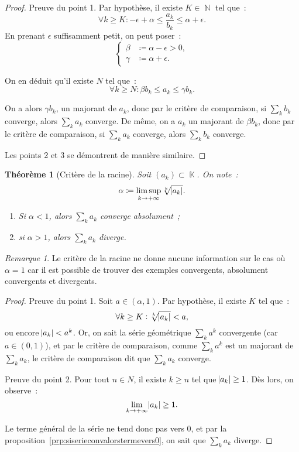 \documentclass{article}
\DeclareMathOperator{\K}{\mathbb K}
\DeclareMathOperator{\N}{\mathbb N}
\newtheorem{thm}{Théorème}[section]
\theoremstyle{definition}
\theoremstyle{remark}
\newtheorem*{rmq}{Remarque}
\begin{document}
		\begin{proof} Preuve du point 1. Par hypothèse, il existe $K \in \N$ tel que~:
		\[\forall k \geq K : -\epsilon + \alpha \leq \frac {a_k}{b_k} \leq \alpha + \epsilon.\]
		En prenant $\epsilon$ suffisamment petit, on peut poser~:
		\[\begin{cases}\beta &\coloneqq \alpha - \epsilon > 0, \\\gamma &\coloneqq \alpha + \epsilon.\end{cases}\]

		On en déduit qu'il existe $N$ tel que~:
		\[\forall k \geq N : \beta b_k \leq a_k \leq \gamma b_k.\]

		On a alors $\gamma b_k$, un majorant de $a_k$,  donc par le critère de comparaison, si $\sum_k b_k$ converge, alors $\sum_k a_k$ converge.
		De même, on a $a_k$ un majorant de $\beta b_k$, donc par le critère de comparaison, si $\sum_k a_k$ converge, alors $\sum_k b_k$ converge.

		Les points 2 et 3 se démontrent de manière similaire.
		\end{proof}

		\begin{thm}[Critère de la racine] Soit $(a_k) \subset \K$. On note~:
		\[\alpha \coloneqq \limsup_{k \to +\infty}\sqrt[k]{\abs {a_k}}.\]

		\begin{enumerate}
			\item Si $\alpha < 1$, alors $\sum_k a_k$ converge absolument~;
			\item si $\alpha > 1$, alors $\sum_k a_k$ diverge.
		\end{enumerate}
		\end{thm}

		\begin{rmq} Le critère de la racine ne donne aucune information sur le cas où $\alpha = 1$ car il est possible de trouver des exemples convergents,
		absolument convergents et divergents.
		\end{rmq}

		\begin{proof} Preuve du point 1. Soit $a \in (\alpha, 1)$. Par hypothèse, il existe $K$ tel que~:
		\[\forall k \geq K : \sqrt[k]{\abs {a_k}} < a,\]
		ou encore $\abs {a_k} < a^k$. Or, on sait la série géométrique $\sum_k a^k$ convergente (car $a \in (0, 1)$), et par le critère de comparaison, comme
		$\sum_k a^k$ est un majorant de $\sum_k a_k$, le critère de comparaison dit que $\sum_k a_k$ converge.

		Preuve du point 2. Pour tout $n \in N$, il existe $k \geq n$ tel que $\abs {a_k} \geq 1$. Dès lors, on observe~:
		\[\lim_{k \to +\infty}\abs {a_k} \geq 1.\]

		Le terme général de la série ne tend donc pas vers 0, et par la proposition~\ref{prp:siserieconvalorstermevers0}, on sait que $\sum_k a_k$ diverge.
		\end{proof}
\end{document}
